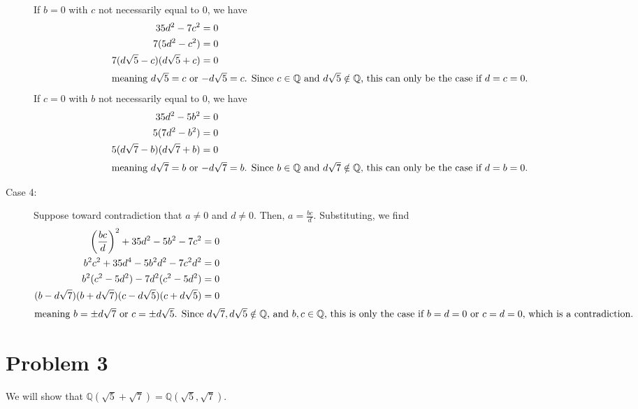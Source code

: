 \documentclass[11pt]{extarticle}
\newcommand{\Q}{\mathbb{Q}}
\begin{document}
\begin{description}
      If $b = 0$ with $c$ not necessarily equal to $0$, we have
      \begin{align*}
        35d^2 - 7c^2 &= 0\\
        7(5d^2 - c^2) &= 0\\
        7(d\sqrt{5} - c)(d\sqrt{5} + c) &= 0\\
        \intertext{meaning $d\sqrt{5} = c$ or $-d\sqrt{5} = c$. Since $c\in\Q$ and $d\sqrt{5}\notin \Q$, this can only be the case if $d=c=0$.}
      \end{align*}
      If $c = 0$ with $b$ not necessarily equal to $0$, we have
      \begin{align*}
        35d^2 - 5b^2 &= 0\\
        5(7d^2 - b^2) &= 0\\
        5(d\sqrt{7} - b)(d\sqrt{7} + b) &= 0\\
        \intertext{meaning $d\sqrt{7} = b$ or $-d\sqrt{7} = b$. Since $b\in\Q$ and $d\sqrt{7}\notin \Q$, this can only be the case if $d=b=0$.}
      \end{align*}
    \item[Case 4:] Suppose toward contradiction that $a\neq 0$ and $d\neq 0$. Then, $a = \frac{bc}{d}$. Substituting, we find
      \begin{align*}
        \left(\frac{bc}{d}\right)^2 + 35d^2 - 5b^2 - 7c^2 &= 0\\
        b^2c^2 + 35d^4 - 5b^2d^2 - 7c^2d^2 &= 0\\
        b^2(c^2 - 5d^2) - 7d^2(c^2 - 5d^2) &= 0\\
        (b-d\sqrt{7})(b+d\sqrt{7})(c-d\sqrt{5})(c+d\sqrt{5}) &= 0\\
        \intertext{meaning $b = \pm d\sqrt{7}$ or $c = \pm d\sqrt{5}$. Since $d\sqrt{7},d\sqrt{5}\notin \Q$, and $b,c\in\Q$, this is only the case if $b=d=0$ or $c=d=0$, which is a contradiction.}
      \end{align*}
  \end{description}
  \section{Problem 3}%
  We will show that $\Q(\sqrt{5} + \sqrt{7}) = \Q(\sqrt{5},\sqrt{7})$.\\
\end{document}
